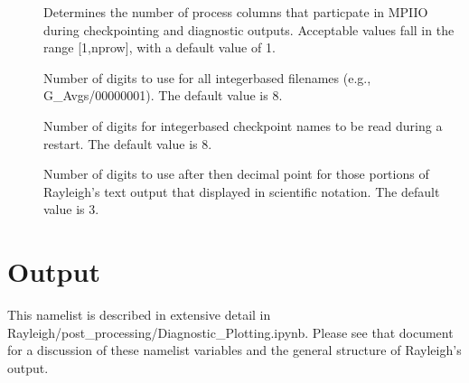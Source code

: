 \documentclass[letterpaper,11pt,english]{sphinxmanual}
\begin{document}
\begin{description}
\item[{}] \leavevmode
\sphinxAtStartPar
Determines the number of process columns that particpate in MPI\sphinxhyphen{}IO during checkpointing and diagnostic outputs.  Acceptable values fall in the range {[}1,nprow{]}, with a default value of 1.

\item[{}] \leavevmode
\sphinxAtStartPar
Number of digits to use for all integer\sphinxhyphen{}based filenames (e.g., G\_Avgs/00000001).  The default value is 8.

\item[{}] \leavevmode
\sphinxAtStartPar
Number of digits for integer\sphinxhyphen{}based checkpoint names to be read during a restart.  The default value is 8.

\item[{}] \leavevmode
\sphinxAtStartPar
Number of digits to use after then decimal point for those portions of Rayleigh’s text output that displayed in scientific notation.  The default value is 3.

\end{description}


\section{Output}
\label{\detokenize{doc/source/Namelist_Definitions/Namelist_Variables:output}}
\sphinxAtStartPar
This namelist is described in extensive detail in Rayleigh/post\_processing/Diagnostic\_Plotting.ipynb.  Please see that document for a discussion of these namelist variables and the general structure of Rayleigh’s output.
\end{document}
